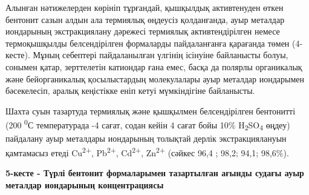 Алынған нәтижелерден көрініп тұрғандай, қышқылдық активтенуден өткен
бентонит сазын алдын ала термиялық өңдеусіз қолданғанда, ауыр металдар
иондарының экстракциялану дәрежесі термиялық активтендірілген немесе
термоқышқылды белсендірілген формаларды пайдаланғанға қарағанда төмен
(4-кесте). Мұның себептері пайдаланылған үлгінің ісінуіне байланысты
болуы, сонымен қатар, зерттелетін катиондар ғана емес, басқа да полярлы
органикалық және бейорганикалық қосылыстардың молекулалары ауыр металдар
иондарымен бәсекелесіп, аралық кеңістікке еніп кетуі мүмкіндігіне
байланысты.

Шахта суын тазартуда термиялық және қышқылмен белсендірілген бентонитті
(200 \textsuperscript{0}С температурада -4 сағат, содан кейін 4 сағат
бойы 10\% H\textsubscript{2}SO\textsubscript{4} өңдеу) пайдалану ауыр
металдары иондарының толықтай дерлік экстракциялануын қамтамасыз етеді
Cu\textsuperscript{2+}, Pb\textsuperscript{2+}, Cd\textsuperscript{2+},
Zn\textsuperscript{2+} (сәйкес 96,4 ; 98,2; 94,1; 98,6\%).

{\bfseries 5-кесте - Түрлі бентонит формаларымен тазартылған ағынды судағы
ауыр металдар иондарының концентрациясы}

